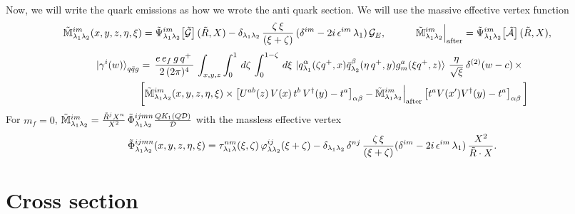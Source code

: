 \documentclass[9pt]{article}
\newcommand{\GE}{\mathcal{G}_{E}}            %
\newcommand{\Mq}{\Tilde{\mathbb{M}}}
\numberwithin{equation}{section}
\begin{document}
\begin{enumerate}
\begin{align}
\end{align}
Now, we will write the quark emissions as how we wrote the anti quark section. We will use the massive effective vertex function
\begin{align}\label{eq:Mqdef}
    \Mq^{im}_{\lambda_{1}\lambda_{2}}(x,y,z,\eta,\xi) & = \Tilde{\Psi}^{im}_{\lambda_{1}\lambda_{2}}\!\left[\Tilde{\mathcal{G}}\right](\Tilde{R},X)-\delta_{\lambda_{1}\lambda_{2}}\, \frac{\zeta\,\xi}{(\xi+\zeta)}\,(\delta^{im}-2i\,\epsilon^{im}\,\lambda_{1})\,\GE, \hspace{3em} \Mq^{im}_{\lambda_{1}\lambda_{2}}\Big|_{\text{after}} = \Tilde{\Psi}^{im}_{\lambda_{1}\lambda_{2}}\!\left[\Tilde{\mathcal{A}}\right](\Tilde{R},X),
\end{align}
\begin{align}\label{eq:qfull}
     \ket{\gamma^{i}(w)}_{q\Bar{q}g} & = \,\frac{e\,e_{f}\,g\,q^{+}\,}{2\,(2\pi)^{4}}\, \int_{x,y,z} \int_{0}^{1}\, d\zeta\, \int_{0}^{1-\zeta}\, d\xi\,\ket{q^{\alpha}_{\lambda_{1}}(\zeta q^{+},x)\Bar{q}^{\beta}_{\lambda_{2}}(\eta\,q^{+},y)g^{a}_{m}(\xi q^{+},z)}\, \frac{\eta}{\sqrt{\xi}}\, \delta^{(2)}(w-c)\,\times \notag \\ & \bigg[\Mq^{im}_{\lambda_{1}\lambda_{2}}(x,y,z,\eta,\xi)\times \left[U^{ab}(z)\,V(x)\,t^{b}\,V^{\dagger}(y)-t^{a}\right]_{\alpha\beta}-\Mq^{im}_{\lambda_{1}\lambda_{2}}\Big|_{\text{after}}\left[t^{a}V(x')V^{\dagger}(y)-t^{a}\right]_{\alpha\beta}\bigg]
\end{align}
For $m_{f}=0$, $\Mq^{im}_{\lambda_{1}\lambda_{2}} = \frac{\Tilde{R}^{j}X^{n}}{X^{2}}\,\Tilde{\Phi}^{ijmn}_{\lambda_{1}\lambda_{2}}\frac{QK_{1}(Q\mathcal{D})}{\mathcal{D}}$ with the massless effective vertex
$$\Tilde{\Phi}^{ijmn}_{\lambda_{1}\lambda_{2}}(x,y,z,\eta,\xi) = \tau^{nm}_{\lambda_{1}\lambda}(\xi,\zeta)\,\varphi^{ij}_{\lambda\lambda_{2}}(\xi + \zeta)-\delta_{\lambda_{1}\lambda_{2}}\, \delta^{nj}\,\frac{\zeta\,\xi}{(\xi+\zeta)}(\delta^{im}-2i\,\epsilon^{im}\,\lambda_{1})\,\frac{X^{2}}{\Tilde{R}\cdot X}.$$
\end{enumerate}

\section{Cross section}
\end{document}
